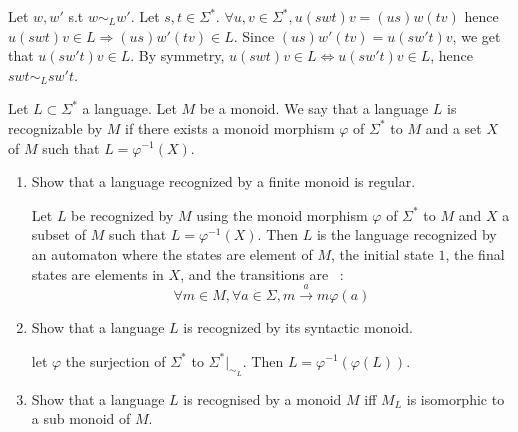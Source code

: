 \documentclass[a4paper,11pt]{exam}
\begin{document}
\begin{questions}
  \begin{solution}
    Let $w,w'$ s.t $w \sim_L w'$.
    Let $s,t \in \Sigma^*$.
    $\forall u,v \in \Sigma^*, u(swt)v=(us)w(tv)$ hence
  ${u(swt)v \in L} \Rightarrow (us)w'(tv) \in L$.
    Since $(us)w'(tv)=u(sw't)v$, we get that $u(sw't)v \in L$.
    By symmetry, $u(swt)v \in L \iff u(sw't)v \in L$, hence $swt \sim_L sw't$.
  \end{solution}

  Let $L \subset \Sigma^*$ a language.
  Let $M$ be a monoid. We say that a language $L$ is recognizable by $M$ if there exists a monoid morphism
  $\varphi$ of $\Sigma^*$ to $M$ and a set $X$ of $M$ such that  $L = \varphi^{-1}(X)$.
  \begin{enumerate}
    \item Show that a language recognized by a finite monoid is regular.

      \begin{solution}
        Let $L$ be recognized by $M$ using the monoid morphism $\varphi$ of $\Sigma^*$ to $M$ and $X$ a subset of $M$ such that $L = \varphi^{-1}(X)$.
        Then $L$ is the language recognized by an automaton where the states are element of $M$, the initial state $1$, the final states are elements in $X$, and the transitions are ~:
        \[
          \forall m \in M, \forall a \in \Sigma, m \xrightarrow{a} m\varphi(a)
        \]
      \end{solution}

    \item Show that a language  $L$ is recognized by its syntactic monoid.

      \begin{solution}
        let $\varphi$ the surjection of $\Sigma^*$ to
        $\Sigma^*|_{\sim_L}$.
        Then $L=\varphi^{-1}(\varphi(L))$.
      \end{solution}

    \item Show that a language  $L$ is recognised by a monoid $M$ iff $M_L$ is isomorphic to a sub monoid of $M$.

      \begin{solution}
%      	
      	

\end{solution}
\end{enumerate}
\end{questions}
\end{document}
